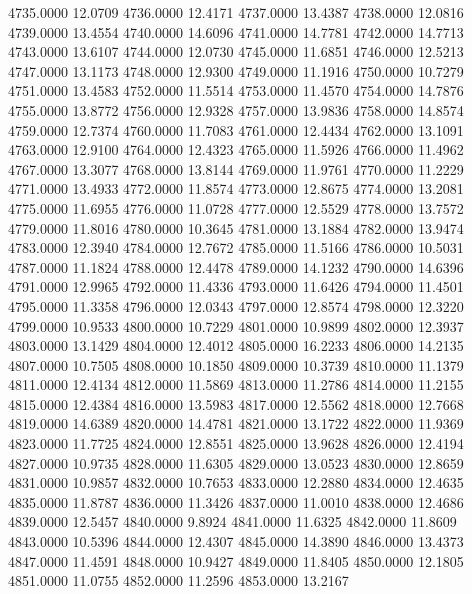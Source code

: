 4735.0000     12.0709
4736.0000     12.4171
4737.0000     13.4387
4738.0000     12.0816
4739.0000     13.4554
4740.0000     14.6096
4741.0000     14.7781
4742.0000     14.7713
4743.0000     13.6107
4744.0000     12.0730
4745.0000     11.6851
4746.0000     12.5213
4747.0000     13.1173
4748.0000     12.9300
4749.0000     11.1916
4750.0000     10.7279
4751.0000     13.4583
4752.0000     11.5514
4753.0000     11.4570
4754.0000     14.7876
4755.0000     13.8772
4756.0000     12.9328
4757.0000     13.9836
4758.0000     14.8574
4759.0000     12.7374
4760.0000     11.7083
4761.0000     12.4434
4762.0000     13.1091
4763.0000     12.9100
4764.0000     12.4323
4765.0000     11.5926
4766.0000     11.4962
4767.0000     13.3077
4768.0000     13.8144
4769.0000     11.9761
4770.0000     11.2229
4771.0000     13.4933
4772.0000     11.8574
4773.0000     12.8675
4774.0000     13.2081
4775.0000     11.6955
4776.0000     11.0728
4777.0000     12.5529
4778.0000     13.7572
4779.0000     11.8016
4780.0000     10.3645
4781.0000     13.1884
4782.0000     13.9474
4783.0000     12.3940
4784.0000     12.7672
4785.0000     11.5166
4786.0000     10.5031
4787.0000     11.1824
4788.0000     12.4478
4789.0000     14.1232
4790.0000     14.6396
4791.0000     12.9965
4792.0000     11.4336
4793.0000     11.6426
4794.0000     11.4501
4795.0000     11.3358
4796.0000     12.0343
4797.0000     12.8574
4798.0000     12.3220
4799.0000     10.9533
4800.0000     10.7229
4801.0000     10.9899
4802.0000     12.3937
4803.0000     13.1429
4804.0000     12.4012
4805.0000     16.2233
4806.0000     14.2135
4807.0000     10.7505
4808.0000     10.1850
4809.0000     10.3739
4810.0000     11.1379
4811.0000     12.4134
4812.0000     11.5869
4813.0000     11.2786
4814.0000     11.2155
4815.0000     12.4384
4816.0000     13.5983
4817.0000     12.5562
4818.0000     12.7668
4819.0000     14.6389
4820.0000     14.4781
4821.0000     13.1722
4822.0000     11.9369
4823.0000     11.7725
4824.0000     12.8551
4825.0000     13.9628
4826.0000     12.4194
4827.0000     10.9735
4828.0000     11.6305
4829.0000     13.0523
4830.0000     12.8659
4831.0000     10.9857
4832.0000     10.7653
4833.0000     12.2880
4834.0000     12.4635
4835.0000     11.8787
4836.0000     11.3426
4837.0000     11.0010
4838.0000     12.4686
4839.0000     12.5457
4840.0000      9.8924
4841.0000     11.6325
4842.0000     11.8609
4843.0000     10.5396
4844.0000     12.4307
4845.0000     14.3890
4846.0000     13.4373
4847.0000     11.4591
4848.0000     10.9427
4849.0000     11.8405
4850.0000     12.1805
4851.0000     11.0755
4852.0000     11.2596
4853.0000     13.2167
